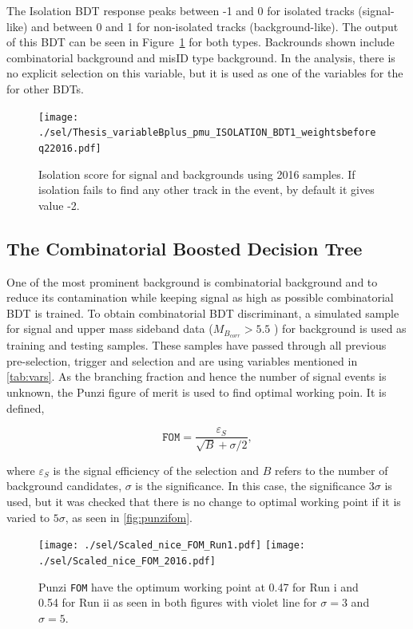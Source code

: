 The Isolation BDT response peaks between -1 and 0 for isolated tracks (signal-like) and between 0 and 1 for non-isolated tracks (background-like). The output of this BDT can be seen in Figure~\ref{fig:isolation} for both types. Backrounds shown include combinatorial background and misID type background. In the analysis, there is no explicit selection on this variable, but it is used as one of the variables for the for other BDTs.

\begin{figure}[ht]
\centering
	\texttt{[image: ./sel/Thesis\_variableBplus\_pmu\_ISOLATION\_BDT1\_weightsbeforeq22016.pdf]}
\caption{Isolation score for signal and backgrounds using 2016 samples. If isolation fails to find any other track in the event, by default it gives value -2.}
\label{fig:isolation}
\end{figure}

\subsection{The Combinatorial Boosted Decision Tree}
\label{CombiBDTsel}
One of the most prominent background is combinatorial background and to reduce its contamination while keeping signal as high as possible combinatorial BDT is trained.
To obtain combinatorial BDT discriminant, a simulated sample for signal and upper mass sideband data ($M_{B_{corr}}>5.5$ \gevcc) for background is used as training and testing samples. These samples have passed through all previous pre-selection, trigger and selection and are using variables mentioned in \autoref{tab:vars}. As the branching fraction and hence the number of signal events is unknown, the Punzi figure of merit \cite{Punzi:2003bu} is used to find optimal working poin. It is defined,

\begin{equation}
	\texttt{FOM}=\frac{\varepsilon_{S}}{\sqrt{B}+\sigma/2},
\end{equation}

where $\varepsilon_{S}$ is the signal efficiency of the selection and $B$ refers to the number of
background candidates, $\sigma$ is the significance. In this case, the significance 3$\sigma$ is used, but it was checked that there is no change to optimal working point if it is varied to $5\sigma$, as seen in \autoref{fig:punzifom}.

\begin{figure}[ht]
\centering
	\texttt{[image: ./sel/Scaled\_nice\_FOM\_Run1.pdf]}%
	\texttt{[image: ./sel/Scaled\_nice\_FOM\_2016.pdf]}%
	\caption{ Punzi \texttt{FOM} have the optimum working point at 0.47 for Run \Rn{1} and 0.54 for Run \Rn{2} as seen in both figures with violet line for $\sigma=3$ and $\sigma=5$.}
\label{fig:punzifom}
\end{figure}



